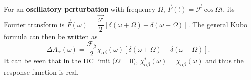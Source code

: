 \documentclass[a4paper,12pts,dvipsnames]{article}
\numberwithin{equation}{section}
\newcommand{\myequations}[1]{%
	\addcontentsline{equ}{myequations}{\protect\numberline{\theequation}#1}\par}
\newcommand{\boxequation}[2]{
	\begin{align} \label{#2} \ensuremath{\boxed{#1}} \end{align} 
	\myequations{#2} \centering \small \textit{#2} \normalsize \justify }
\begin{document}
For an \textbf{oscillatory perturbation} with frequency $\Omega$, $\vec{F}(t) = \vec{\mathcal{F}}\cos{\Omega t}$, its Fourier transform is $\vec{F}(\omega) = \dfrac{\vec{\mathcal{F}}}{2}[\delta(\omega+\Omega)+\delta(\omega-\Omega)].
$
The general Kubo formula can then be written as
\begin{equation}
\Delta A_{\alpha}(\omega) = \frac{\mathcal{F}_{\beta}}{2}\chi_{\alpha\beta}(\omega)[\delta(\omega+\Omega)+\delta(\omega-\Omega)].
\end{equation}
It can be seen that in the DC limit ($\Omega=0$), $\chi^*_{\alpha\beta}(\omega)=\chi_{\alpha\beta}(\omega)$ and thus the response function is real.
\end{document}
